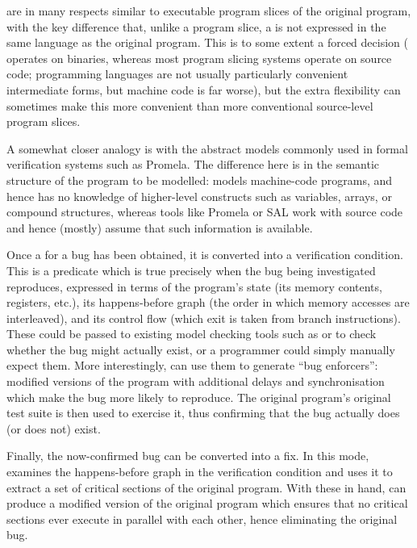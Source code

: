 \STateMachines are in many respects similar to executable program
slices of the original program, with the key difference that, unlike a
program slice, a \StateMachine is not expressed in the same language
as the original program.  This is to some extent a forced decision
({\technique} operates on binaries, whereas most program slicing
systems operate on source code; programming languages are not usually
particularly convenient intermediate forms, but machine code is far
worse), but the extra flexibility can sometimes make this more
convenient than more conventional source-level program
slices.

A somewhat closer analogy is with the abstract models commonly used in
formal verification systems such as Promela\needCite{}.  The
difference here is in the semantic structure of the program to be
modelled: \technique{} models machine-code programs, and hence has no
knowledge of higher-level constructs such as variables, arrays, or
compound structures, whereas tools like Promela or SAL\needCite{} work
with source code and hence (mostly) assume that such information is
available.

Once a {\StateMachine} for a bug has been obtained, it is converted
into a verification condition.  This is a predicate which is true
precisely when the bug being investigated reproduces, expressed in
terms of the program's state (its memory contents, registers, etc.),
its happens-before graph (the order in which memory accesses are
interleaved), and its control flow (which exit is taken from branch
instructions).  These could be passed to existing model checking tools
such as \needCite{} or \needCite{}  to check whether the bug might
actually exist, or a programmer could simply manually expect them.
More interestingly, {\technique} can use them to generate ``bug
enforcers'': modified versions of the program with additional delays
and synchronisation which make the bug more likely to reproduce.  The
original program's original test suite is then used to exercise it,
thus confirming that the bug actually does (or does not) exist.

Finally, the now-confirmed bug can be converted into a fix.  In this
mode, {\technique} examines the happens-before graph in the
verification condition and uses it to extract a set of critical
sections of the original program.  With these in hand, {\technique}
can produce a modified version of the original program which ensures
that no critical sections ever execute in parallel with each other,
hence eliminating the original bug.

